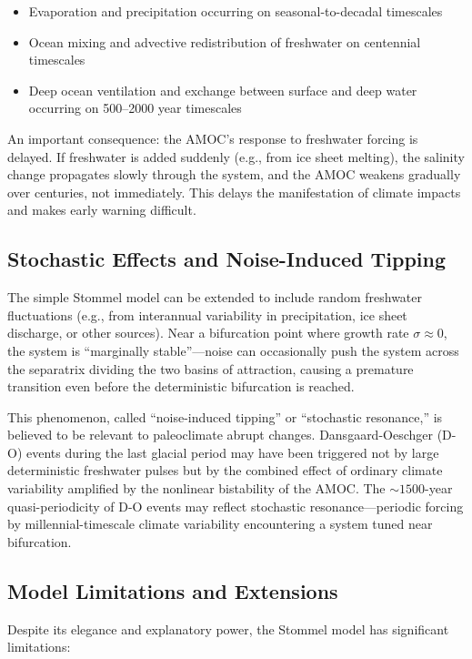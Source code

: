 \documentclass[12pt,letterpaper]{article}
\begin{document}
\begin{itemize}
\item Evaporation and precipitation occurring on seasonal-to-decadal timescales
\item Ocean mixing and advective redistribution of freshwater on centennial timescales
\item Deep ocean ventilation and exchange between surface and deep water occurring on 500--2000 year timescales
\end{itemize}

An important consequence: the AMOC's response to freshwater forcing is delayed. If freshwater is added suddenly (e.g., from ice sheet melting), the salinity change propagates slowly through the system, and the AMOC weakens gradually over centuries, not immediately. This delays the manifestation of climate impacts and makes early warning difficult.

\subsection{Stochastic Effects and Noise-Induced Tipping}

The simple Stommel model can be extended to include random freshwater fluctuations (e.g., from interannual variability in precipitation, ice sheet discharge, or other sources). Near a bifurcation point where growth rate $\sigma \approx 0$, the system is ``marginally stable''---noise can occasionally push the system across the separatrix dividing the two basins of attraction, causing a premature transition even before the deterministic bifurcation is reached.

This phenomenon, called ``noise-induced tipping'' or ``stochastic resonance,'' is believed to be relevant to paleoclimate abrupt changes. Dansgaard-Oeschger (D-O) events during the last glacial period may have been triggered not by large deterministic freshwater pulses but by the combined effect of ordinary climate variability amplified by the nonlinear bistability of the AMOC. The $\sim 1500$-year quasi-periodicity of D-O events may reflect stochastic resonance---periodic forcing by millennial-timescale climate variability encountering a system tuned near bifurcation.

\subsection{Model Limitations and Extensions}

Despite its elegance and explanatory power, the Stommel model has significant limitations:
\end{document}
